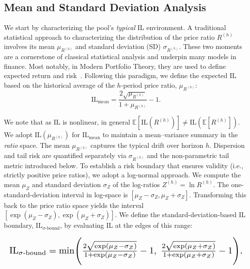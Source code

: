 \documentclass[journal]{IEEEtran}
\begin{document}
\subsection{Mean and Standard Deviation Analysis}
We start by characterizing the pool’s \emph{typical} IL environment.
A traditional statistical approach to characterizing the distribution of the price ratio \(R^{(h)}\) involves its mean \(\mu_{R^{(h)}}\) and standard deviation (SD) \(\sigma_{R^{(h)}}\). These two moments are a cornerstone of classical statistical analysis and underpin many models in finance. 
Most notably, in Modern Portfolio Theory, they are used to define expected return and risk~\cite{markowitz1952portfolio, ross2014introduction}.
Following this paradigm, we define the expected IL based on the historical average of the \(h\)-period price ratio, \(\mu_{R^{(h)}}\):
\begin{equation}
\label{eq:il_mean}
\mathrm{IL}_{\text{mean}} = \frac{2\sqrt{\mu_{R^{(h)}}}}{1+\mu_{R^{(h)}}} - 1.
\end{equation}


We note that as $\mathrm{IL}$ is nonlinear, in general
$\mathbb{E}[\mathrm{IL}(R^{(h)})] \neq \mathrm{IL}(\mathbb{E}[R^{(h)}])$.
We adopt $\mathrm{IL}(\mu_{R^{(h)}})$ for $\mathrm{IL}_{\text{mean}}$ to maintain a mean--variance summary in the \emph{ratio} space. The mean $\mu_{R^{(h)}}$ captures the typical drift over horizon $h$. 
Dispersion and tail risk are quantified separately via $\sigma_{R^{(h)}}$ and the non-parametric tail metric introduced below.
To establish a risk boundary that ensures validity (i.e., strictly positive price ratios), we adopt a log-normal approach. We compute the mean \(\mu_{Z}\) and standard deviation \(\sigma_{Z}\) of the log-ratios \(Z^{(h)} = \ln R^{(h)}\). The one-standard-deviation interval in log-space is \([\mu_{Z}-\sigma_{Z}, \mu_{Z}+\sigma_{Z}]\). Transforming this back to the price ratio space yields the interval \([\exp(\mu_{Z}-\sigma_{Z}), \exp(\mu_{Z}+\sigma_{Z})]\). We define the standard-deviation-based IL boundary, \(\mathrm{IL}_{\sigma\text{-bound}}\), by evaluating IL at the edges of this range:

\begin{equation}
\label{eq:il_sigma_bound}
\resizebox{\linewidth}{!}{$%
\mathrm{IL}_{\sigma\text{-bound}}
= \min\Biggl(
\frac{2\sqrt{\exp(\mu_{Z} - \sigma_{Z})}}{1+\exp(\mu_{Z} - \sigma_{Z})} - 1,\;
\frac{2\sqrt{\exp(\mu_{Z} + \sigma_{Z})}}{1+\exp(\mu_{Z} + \sigma_{Z})} - 1
\Biggr).
$}
\end{equation}
\end{document}
